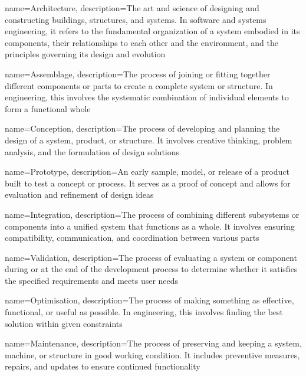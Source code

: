 {
    name=Architecture,
    description={The art and science of designing and constructing buildings, structures, and systems. In software and systems engineering, it refers to the fundamental organization of a system embodied in its components, their relationships to each other and the environment, and the principles governing its design and evolution}
}

{
    name=Assemblage,
    description={The process of joining or fitting together different components or parts to create a complete system or structure. In engineering, this involves the systematic combination of individual elements to form a functional whole}
}

{
    name=Conception,
    description={The process of developing and planning the design of a system, product, or structure. It involves creative thinking, problem analysis, and the formulation of design solutions}
}

{
    name=Prototype,
    description={An early sample, model, or release of a product built to test a concept or process. It serves as a proof of concept and allows for evaluation and refinement of design ideas}
}

{
    name=Integration,
    description={The process of combining different subsystems or components into a unified system that functions as a whole. It involves ensuring compatibility, communication, and coordination between various parts}
}

{
    name=Validation,
    description={The process of evaluating a system or component during or at the end of the development process to determine whether it satisfies the specified requirements and meets user needs}
}

{
    name=Optimisation,
    description={The process of making something as effective, functional, or useful as possible. In engineering, this involves finding the best solution within given constraints}
}

{
    name=Maintenance,
    description={The process of preserving and keeping a system, machine, or structure in good working condition. It includes preventive measures, repairs, and updates to ensure continued functionality}
}